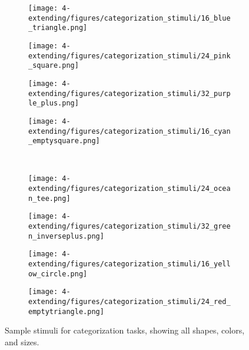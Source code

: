 \begin{figure}[!htb]
\centering
\begin{subfigure}{0.24\textwidth}
\texttt{[image: 4-extending/figures/categorization\_stimuli/16\_blue\_triangle.png]}
\end{subfigure}%
\begin{subfigure}{0.24\textwidth}
\texttt{[image: 4-extending/figures/categorization\_stimuli/24\_pink\_square.png]}
\end{subfigure}%
\begin{subfigure}{0.24\textwidth}
\texttt{[image: 4-extending/figures/categorization\_stimuli/32\_purple\_plus.png]}
\end{subfigure}%
\begin{subfigure}{0.24\textwidth}
\texttt{[image: 4-extending/figures/categorization\_stimuli/16\_cyan\_emptysquare.png]}
\end{subfigure}\\
\begin{subfigure}{0.24\textwidth}
\texttt{[image: 4-extending/figures/categorization\_stimuli/24\_ocean\_tee.png]}
\end{subfigure}%
\begin{subfigure}{0.24\textwidth}
\texttt{[image: 4-extending/figures/categorization\_stimuli/32\_green\_inverseplus.png]}
\end{subfigure}%
\begin{subfigure}{0.24\textwidth}
\texttt{[image: 4-extending/figures/categorization\_stimuli/16\_yellow\_circle.png]}
\end{subfigure}%
\begin{subfigure}{0.24\textwidth}
\texttt{[image: 4-extending/figures/categorization\_stimuli/24\_red\_emptytriangle.png]}
\end{subfigure}%
\caption{Sample stimuli for categorization tasks, showing all shapes, colors, and sizes.} \label{fig:app_extending_cat_stims}
\end{figure}
